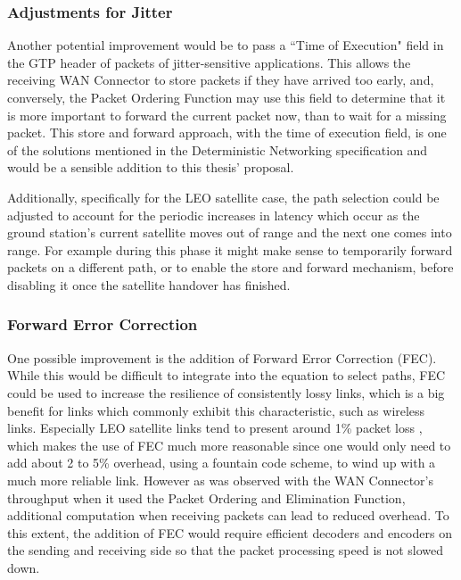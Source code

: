 \subsubsection{Adjustments for Jitter}

Another potential improvement would be to pass a “Time of Execution" field in the GTP header of packets of jitter-sensitive applications. This allows the receiving WAN Connector to store packets if they have arrived too early, and, conversely, the Packet Ordering Function may use this field to determine that it is more important to forward the current packet now, than to wait for a missing packet. This store and forward approach, with the time of execution field, is one of the solutions mentioned in the Deterministic Networking specification and would be a sensible addition to this thesis' proposal.

Additionally, specifically for the LEO satellite case, the path selection could be adjusted to account for the periodic increases in latency which occur as the ground station's current satellite moves out of range and the next one comes into range. For example during this phase it might make sense to temporarily forward packets on a different path, or to enable the store and forward mechanism, before disabling it once the satellite handover has finished.

\subsubsection{Forward Error Correction}

One possible improvement is the addition of Forward Error Correction (FEC). While this would be difficult to integrate into the equation to select paths, FEC could be used to increase the resilience of consistently lossy links, which is a big benefit for links which commonly exhibit this characteristic, such as wireless links. Especially LEO satellite links tend to present around 1\% packet loss \cite{deutschmann2022broadband}, which makes the use of FEC much more reasonable since one would only need to add about 2 to 5\% overhead, using a fountain code scheme, to wind up with a much more reliable link. However as was observed with the WAN Connector's throughput when it used the Packet Ordering and Elimination Function, additional computation when receiving packets can lead to reduced overhead. To this extent, the addition of FEC would require efficient decoders and encoders on the sending and receiving side so that the packet processing speed is not slowed down.

